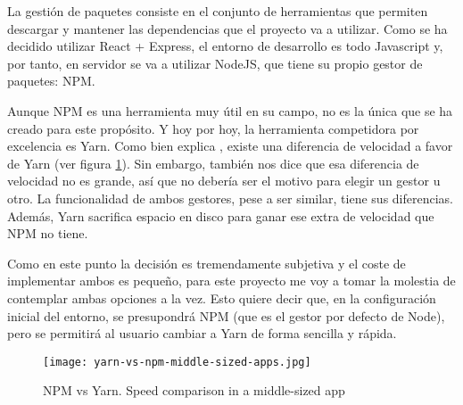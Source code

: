 La gestión de paquetes consiste en el conjunto de herramientas que permiten descargar y mantener las dependencias que el proyecto va a utilizar. Como se ha decidido utilizar React + Express, el entorno de desarrollo es todo Javascript y, por tanto, en servidor se va a utilizar NodeJS, que tiene su propio gestor de paquetes: NPM.

Aunque NPM es una herramienta muy útil en su campo, no es la única que se ha creado para este propósito. Y hoy por hoy, la herramienta competidora por excelencia es Yarn. Como bien explica \citet{NPMVYRN}, existe una diferencia de velocidad a favor de Yarn (ver figura \cref{fig:package-manager:middle-size}). Sin embargo, \citet{NPMVYRN} también nos dice que esa diferencia de velocidad no es grande, así que no debería ser el motivo para elegir un gestor u otro. La funcionalidad de ambos gestores, pese a ser similar, tiene sus diferencias. Además, Yarn sacrifica espacio en disco para ganar ese extra de velocidad que NPM no tiene.

Como en este punto la decisión es tremendamente subjetiva y el coste de implementar ambos es pequeño, para este proyecto me voy a tomar la molestia de contemplar ambas opciones a la vez. Esto quiere decir que, en la configuración inicial del entorno, se presupondrá NPM (que es el gestor por defecto de Node), pero se permitirá al usuario cambiar a Yarn de forma sencilla y rápida.

\begin{figure}
	\centering
	\texttt{[image: yarn-vs-npm-middle-sized-apps.jpg]}
	\caption{NPM vs Yarn. Speed comparison in a middle-sized app}
	\label{fig:package-manager:middle-size}
\end{figure}
